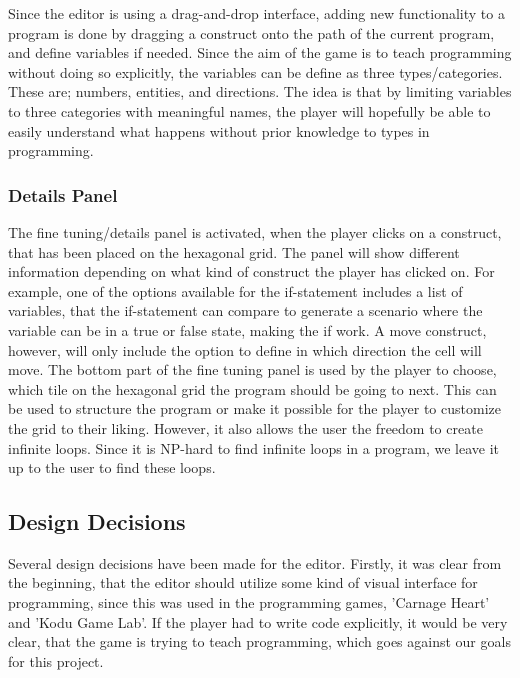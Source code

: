 Since the editor is using a drag-and-drop interface, adding new functionality to a program is done by dragging a construct onto the path of the current program, and define variables if needed.
Since the aim of the game is to teach programming without doing so explicitly, the variables can be define as three types/categories.
These are; numbers, entities, and directions.
The idea is that by limiting variables to three categories with meaningful names, the player will hopefully be able to easily understand what happens without prior knowledge to types in programming.

\subsubsection*{Details Panel}
The fine tuning/details panel is activated, when the player clicks on a construct, that has been placed on the hexagonal grid.
The panel will show different information depending on what kind of construct the player has clicked on.
For example, one of the options available for the if-statement includes a list of variables, that the if-statement can compare to generate a scenario where the variable can be in a true or false state, making the if work.
A move construct, however, will only include the option to define in which direction the cell will move.
The bottom part of the fine tuning panel is used by the player to choose, which tile on the hexagonal grid the program should be going to next.
This can be used to structure the program or make it possible for the player to customize the grid to their liking.
However, it also allows the user the freedom to create infinite loops.
Since it is NP-hard to find infinite loops in a program, we leave it up to the user to find these loops. 

\subsection{Design Decisions}
Several design decisions have been made for the editor.
Firstly, it was clear from the beginning, that the editor should utilize some kind of visual interface for programming, since this was used in the programming games, 'Carnage Heart' and 'Kodu Game Lab'.
If the player had to write code explicitly, it would be very clear, that the game is trying to teach programming, which goes against our goals for this project.\newline

